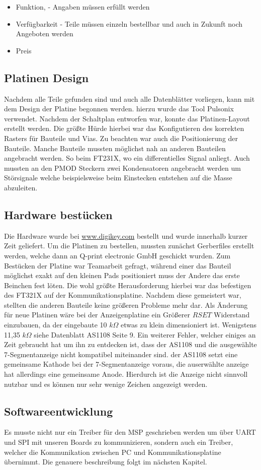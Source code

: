 \begin{itemize}
	\item Funktion, - Angaben müssen erfüllt werden
	\item Verfügbarkeit - Teile müssen einzeln bestellbar und auch in Zukunft noch Angeboten werden
	\item Preis
\end{itemize}

\subsection{Platinen Design}
Nachdem alle Teile gefunden sind und auch alle Datenblätter vorliegen, kann mit dem Design der Platine begonnen werden.
hierzu wurde das Tool Pulsonix verwendet. Nachdem der Schaltplan entworfen war, konnte das Platinen-Layout erstellt werden. Die größte Hürde hierbei war das Konfigutieren des korrekten Rasters für Bauteile und Vias.
Zu beachten war auch die Positionierung der Bauteile. Manche Bauteile mussten möglichst nah an anderen Bauteilen angebracht werden. So beim FT231X, wo ein differentielles Signal anliegt.
Auch mussten an den PMOD Steckern zwei Kondensatoren angebracht werden um Störsignale welche beispielsweise beim Einstecken entstehen auf die Masse abzuleiten.

\subsection{Hardware bestücken}
Die Hardware wurde bei \url{www.digikey.com} bestellt und wurde innerhalb kurzer Zeit geliefert. Um die Platinen zu bestellen, mussten zunächst Gerberfiles erstellt werden, welche dann an Q-print electronic GmbH geschickt wurden.
Zum Bestücken der Platine war Teamarbeit gefragt, während einer das Bauteil möglichst exakt auf den kleinen Pads positioniert muss der Andere das erste Beinchen fest löten. Die wohl größte Herausforderung hierbei war das befestigen des FT321X auf der Kommunikationsplatine. Nachdem diese  gemeistert war, stellten die anderen Bauteile keine größeren Probleme mehr dar.
Als Änderung für neue Platinen wäre bei der Anzeigenplatine ein Größerer $RSET$ Widerstand einzubauen, da der eingebaute 10 $k\Omega$ etwas zu klein dimensioniert ist. Wenigstens 11,35 $k\Omega$ siehe Datenblatt AS1108 Seite 9.
Ein weiterer Fehler, welcher einiges an Zeit gebraucht hat um ihn zu entdecken ist, dass der AS1108 und die ausgewählte 7-Segmentanzeige nicht kompatibel miteinander sind. der AS1108 setzt eine gemeinsame Kathode bei der 7-Segmentanzeige voraus, die auserwählte anzeige hat allerdings eine gemeinsame Anode. Hierdurch ist die Anzeige nicht sinnvoll nutzbar und es können nur sehr wenige Zeichen angezeigt werden.

\subsection{Softwareentwicklung}
Es musste nicht nur ein Treiber für den MSP geschrieben werden um über UART und SPI mit unseren Boards zu kommunizieren, sondern auch ein Treiber, welcher die Kommunikation zwischen PC und Kommunikationsplatine übernimmt. Die genauere beschreibung folgt im nächsten Kapitel.

